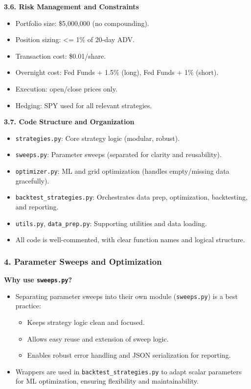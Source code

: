 \documentclass[11pt]{article}
\providecommand{\tightlist}{%
      \setlength{\itemsep}{0pt}\setlength{\parskip}{0pt}}
\begin{document}
\textbf{3.6. Risk Management and Constraints}

\begin{itemize}
\tightlist
\item
  Portfolio size: \$5,000,000 (no compounding).
\item
  Position sizing: \textless= 1\% of 20-day ADV.
\item
  Transaction cost: \$0.01/share.
\item
  Overnight cost: Fed Funds + 1.5\% (long), Fed Funds + 1\% (short).
\item
  Execution: open/close prices only.
\item
  Hedging: SPY used for all relevant strategies.
\end{itemize}

\textbf{3.7. Code Structure and Organization}

\begin{itemize}
\tightlist
\item
  \texttt{strategies.py}: Core strategy logic (modular, robust).
\item
  \texttt{sweeps.py}: Parameter sweeps (separated for clarity and
  reusability).
\item
  \texttt{optimizer.py}: ML and grid optimization (handles empty/missing
  data gracefully).
\item
  \texttt{backtest\_strategies.py}: Orchestrates data prep,
  optimization, backtesting, and reporting.
\item
  \texttt{utils.py}, \texttt{data\_prep.py}: Supporting utilities and
  data loading.
\item
  All code is well-commented, with clear function names and logical
  structure.
\end{itemize}

\subsubsection*{4. Parameter Sweeps and Optimization}

\textbf{Why use \texttt{sweeps.py}?}

\begin{itemize}
\tightlist
\item
  Separating parameter sweeps into their own module (\texttt{sweeps.py})
  is a best practice:

  \begin{itemize}
  \tightlist
  \item
    Keeps strategy logic clean and focused.
  \item
    Allows easy reuse and extension of sweep logic.
  \item
    Enables robust error handling and JSON serialization for reporting.
  \end{itemize}
\item
  Wrappers are used in \texttt{backtest\_strategies.py} to adapt scalar
  parameters for ML optimization, ensuring flexibility and
  maintainability.
\end{itemize}
\end{document}
